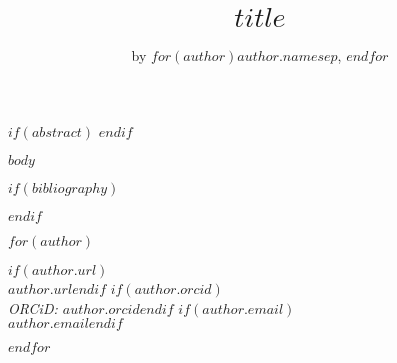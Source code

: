 \title{$title$}
\author{by $for(author)$$author.name$$sep$, $endfor$}

\maketitle

$if(abstract)$
$endif$

$body$

$if(bibliography)$

$endif$

$for(author)$
\address{%
$author.name$
$for(author.affiliation/pairs)$
  $if(it.value)$
    $for(it.value.name)$\\$it.value.name$$endfor$%
    $for(it.value.address)$$it.value.address$$sep$ \\$endfor$\\%
  $else$
   \\$author.affiliation$\\
  $endif$
$endfor$
$for(author.address)$$author.address$$sep$ \\$endfor$%
}
$if(author.url)$\\$author.url$$endif$%
$if(author.orcid)$\\\textit{ORCiD: \href{https://orcid.org/$author.orcid$}{$author.orcid$}}$endif$%
$if(author.email)$\\$author.email$$endif$

$endfor$
